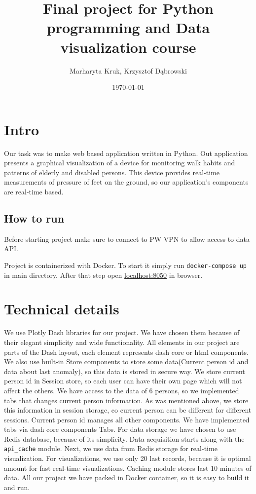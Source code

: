\documentclass{article}
\title{Final project for Python programming and Data visualization course}
\author{Marharyta Kruk, Krzysztof Dąbrowski}
\date{\today}
\begin{document}
\maketitle
\tableofcontents
\newpage

\section{Intro}
Our task was to make web based application written in Python. Out application presents a graphical visualization of a device for monitoring walk habits and patterns of elderly and disabled persons.
This device provides real-time measurements of pressure of feet on the ground, so our application's components are real-time based.
\subsection{How to run}
Before starting project make sure to connect to PW VPN to allow access to data API.

Project is containerized with Docker. To start it simply run \texttt{docker-compose up} in main directory. After that step open \href{http://localhost:8050}{localhost:8050} in browser.

\section{Technical details}
We use Plotly Dash libraries for our project. We have chosen them because of their elegant simplicity and wide functionality. All elements in our project are parts of the Dash layout, each element represents dash core or html components. We also use built-in Store components to store some data(Current person id and data about last anomaly), so this data is stored in secure way. We store current person id in Session store, so each user can have their own page which will not affect the others.
\newline
We have access to the data of 6 persons, so we implemented tabs that changes current person information. As was mentioned above, we store this information in session storage, co current person can be different for different sessions. Current person id manages all other components. We have implemented tabs via dash core components Tabs.
\newline
For data storage we have chosen to use Redis database, because of its simplicity. Data acquisition starts along with the \texttt{api\_cache} module. Next, we use data from Redis storage for real-time visualization. For visualizations, we use only 20 last records, because it is optimal amount for fast real-time visualizations. Caching module stores last 10 minutes of data.
\newline
All our project we have packed in Docker container, so it is easy to build it and run.
\end{document}
